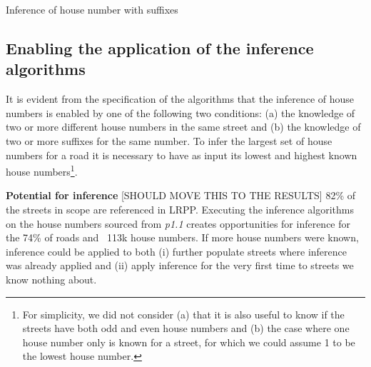 \vspace{5mm}

\begin{algorithm}[H]
    \caption{Inference of house number with suffixes}
    \label{algo:inference-numbers-suffix}
\end{algorithm}

\subsection{Enabling the application of the inference algorithms} 

It is evident from the specification of the algorithms that the inference of house numbers is enabled by one of the following two conditions: (a) the knowledge of two or more different house numbers in the same street and (b) the knowledge of two or more suffixes for the same number. To infer the largest set of house numbers for a road it is necessary to have as input its lowest and highest known house numbers\footnote{For simplicity, we did not consider (a) that it is also useful to know if the streets have both odd and even house numbers and (b) the case where one house number only is known for a street, for which we could assume 1 to be the lowest house number.}.

\textbf{Potential for inference} [SHOULD MOVE THIS TO THE RESULTS] 82\% of the streets in scope are referenced in LRPP. Executing the inference algorithms on the house numbers sourced from {\it p1.1} creates opportunities for inference for the 74\% of roads and ~113k house numbers. If more house numbers were known, inference could be applied to both (i) further populate streets where inference was already applied and (ii) apply inference for the very first time to streets we know nothing about.

\begin{figure}[!ht]
    \begin{floatrow}
   \end{floatrow}
\end{figure}
        
